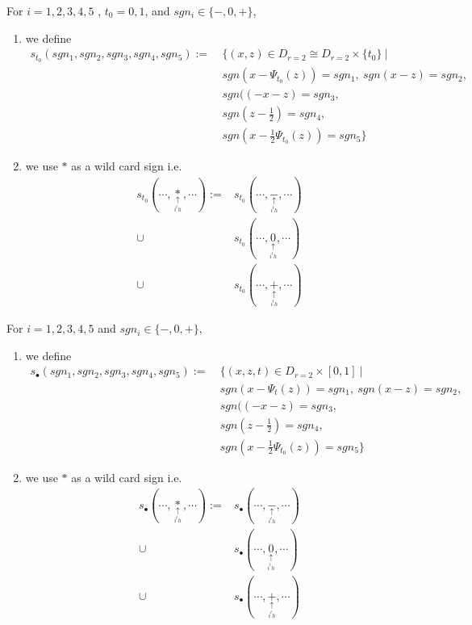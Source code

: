 \begin{definition}
For $i = 1,2,3,4,5$ , $t_0 = 0,1$, and $sgn_i \in \{-,0,+\}$,
\begin{enumerate}
\item we define
\begin{align*}
s_{t_0}(sgn_1,sgn_2,sgn_3,sgn_4,sgn_5):=~ &\{(x,z) \in D_{r=2}\cong D_{r=2}\times \{t_0\} ~| \\
&sgn(x-\Psi_{t_0}(z))=sgn_1,~ sgn(x-z)=sgn_2,\\ 
&sgn((-x-z)=sgn_3,\\
&sgn(z-\frac{1}{2})=sgn_4 ,\\
&sgn(x-\frac{1}{2}\Psi_{t_0}(z))=sgn_5 \}
\end{align*}

\item we use $*$ as a wild card sign i.e. 
\begin{align*}
s_{t_0}(\cdots,\underset{\underset{i^th}{\uparrow}}{*},\cdots):= & s_{t_0}(\cdots,\underset{\underset{i^th}{\uparrow}}{-},\cdots)\\
\cup &s_{t_0}(\cdots,\underset{\underset{i^th}{\uparrow}}{0},\cdots)\\
\cup &s_{t_0}(\cdots,\underset{\underset{i^th}{\uparrow}}{+},\cdots)
\end{align*}
\end{enumerate}
\end{definition}

\begin{definition}
For $i = 1,2,3,4,5$ and $sgn_i \in \{-,0,+\}$,
\begin{enumerate}
\item we define
\begin{align*}
s_\bullet(sgn_1,sgn_2,sgn_3,sgn_4,sgn_5):=~ &\{(x,z,t) \in D_{r=2}\times [0,1] ~| \\
&sgn(x-\Psi_{t}(z))=sgn_1,~ sgn(x-z)=sgn_2,\\ 
&sgn((-x-z)=sgn_3,\\
&sgn(z-\frac{1}{2})=sgn_4 ,\\
&sgn(x-\frac{1}{2}\Psi_{t_0}(z))=sgn_5 \}
\end{align*}

\item we use $*$ as a wild card sign i.e. 
\begin{align*}
s_\bullet(\cdots,\underset{\underset{i^th}{\uparrow}}{*},\cdots):= & s_{\bullet}(\cdots,\underset{\underset{i^th}{\uparrow}}{-},\cdots)\\
\cup &s_{\bullet}(\cdots,\underset{\underset{i^th}{\uparrow}}{0},\cdots)\\
\cup &s_{\bullet}(\cdots,\underset{\underset{i^th}{\uparrow}}{+},\cdots)
\end{align*}
\end{enumerate}
\end{definition}


